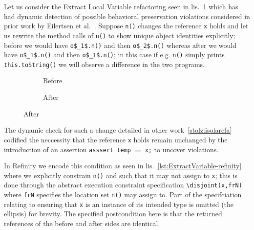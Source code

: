 Let us consider the Extract Local Variable refactoring seen in lis.~\ref{lst:ExtractVariable-java} which has had dynamic detection of
possible behavioral preservation violations considered in prior work by Eilertsen et al.~\cite{stolz:isolarefa}. Suppose \lstinline[style=smallJava]|n()|
changes the reference \lstinline[style=smallJava]|x| holds and let us rewrite the method calls of \lstinline[style=smallJava]|n()| to show unique
object identities explicitly; before we would have \lstinline[mathescape=true,style=smallJava]|o$_1$.n()| and then
\lstinline[mathescape=true,style=smallJava]|o$_2$.n()| whereas after we would have \lstinline[mathescape=true,style=smallJava]|o$_1$.n()|
and then \lstinline[mathescape=true,style=smallJava]|o$_1$.n()|; in this case if e.g. \lstinline[mathescape=true,style=smallJava]|n()|
simply prints \lstinline[mathescape=true,style=smallJava]|this.toString()| we will observe a difference in the two programs.


\begin{figure}[!h]
  \centering
  \begin{subfigure}{.2\linewidth}
    
    \caption{Before}
  \end{subfigure}\hspace{1cm}
  \begin{subfigure}{.3\linewidth}
    
    \caption{After}
  \end{subfigure}
\label{lst:ExtractVariable-java}
\end{figure}

The dynamic check for such a change detailed in other work~\ref{stolz:isolarefa} codified the neccessity that the reference \lstinline[style=smallJava]|x|
holds remain unchanged by the introduction of an assertion \lstinline[style=smallJava]|asssert temp == x;| to uncover violations.

In Refinity we encode this condition as seen in lis.~\ref{lst:ExtractVariable-refinity} where we explicitly constrain \lstinline[style=refinity]|n()| and
such that it may not assign to \lstinline[style=refinity]|x|; this is done through the abstract execution constraint specification \lstinline[style=refinity]|\disjoint(x,frN)|
where \lstinline[style=refinity]|frN| specifies the location set \lstinline[style=refinity]|n()| may assign to. Part of the specifciation relating to
ensuring that \lstinline[style=refinity]|x| is an instance of its intended type is omitted (the ellipsis) for brevity. The specified postcondition here is that the
returned references of the before and after sides are identical.

